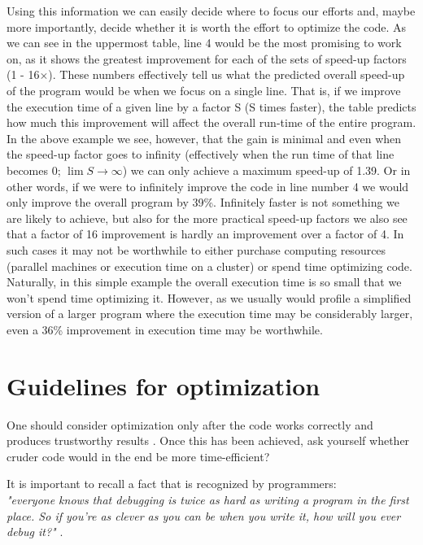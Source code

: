 \documentclass{article}\usepackage[]{graphicx}\usepackage[]{color}
\begin{document}
Using this information we can easily decide where to focus our efforts and, maybe more importantly, decide whether it is worth the effort to optimize the code. As we can see in the uppermost table, line 4 would be the most promising to work on, as it shows the greatest improvement for each of the sets of speed-up factors (1 - 16$\times$). These numbers effectively tell us what the predicted overall speed-up of the program would be when we focus on a single line. That is, if we improve the execution time of a given line by a factor S (S times faster), the table predicts how much this improvement will affect the overall run-time of the entire program. In the above example we see, however, that the gain is minimal and even when the speed-up factor goes to infinity (effectively when the run time of that line becomes 0; $\lim S \to \infty$) we can only achieve a maximum speed-up of 1.39. Or in other words, if we were to infinitely improve the code in line number 4 we would only improve the overall program by 39\%. Infinitely faster is not something we are likely to achieve, but also for the more practical speed-up factors we also see that a factor of 16 improvement is hardly an improvement over a factor of 4. In such cases it may not be worthwhile to either purchase computing resources (parallel machines or execution time on a cluster) or spend time optimizing code. Naturally, in this simple example the overall execution time is so small that we won't spend time optimizing it. However, as we usually would profile a simplified version of a larger program where the execution time may be considerably larger, even a 36\% improvement in execution time may be worthwhile.

\section{Guidelines for optimization}

One should consider optimization only after the code works correctly and produces trustworthy results \citep{Chambers2009}. Once this has been achieved, ask yourself whether cruder code would in the end be more time-efficient? 


It is important to recall a fact that is recognized by programmers:\\
\newline
\textit{"everyone knows that debugging is twice as hard as writing a program in the first place. So if you're as clever as you can be when you write it, how will you ever debug it?"}  \citep{Kernighan1978}.\\ 
\end{document}
